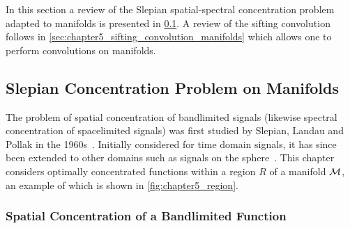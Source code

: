 In this section a review of the Slepian spatial-spectral concentration problem adapted to manifolds is presented in \cref{sec:chapter5_slepian_concentration_problem_manifolds}.
A review of the sifting convolution follows in \cref{sec:chapter5_sifting_convolution_manifolds} which allows one to perform convolutions on manifolds.

\subsection{Slepian Concentration Problem on Manifolds}\label{sec:chapter5_slepian_concentration_problem_manifolds}

The problem of spatial concentration of bandlimited signals (likewise spectral concentration of spacelimited signals) was first studied by Slepian, Landau and Pollak in the 1960s~\cite{Slepian1961,Landau1961,Landau1962}.
Initially considered for time domain signals, it has since been extended to other domains such as signals on the sphere~\cite{Simons2006,Roddy2021a,Xu1983,Wieczorek2005}.
This chapter considers optimally concentrated functions within a region \(R\) of a manifold \(\mathcal{M}{}\), an example of which is shown in \cref{fig:chapter5_region}.



\subsubsection{Spatial Concentration of a Bandlimited Function}

